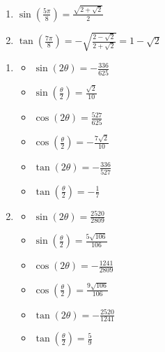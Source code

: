 \begin{multicols}{2}

\begin{enumerate}

\setcounter{enumi}{\value{HW}}

\item $\sin \left( \frac{5\pi}{8} \right) = \frac{\sqrt{2 + \sqrt{2}}}{2}$
\item $\tan \left( \frac{7\pi}{8} \right) = -\sqrt{ \frac{2 - \sqrt{2}}{2 + \sqrt{2}} } =1-\sqrt{2}$

\setcounter{HW}{\value{enumi}}

\end{enumerate}

\end{multicols}

\begin{enumerate}

\setcounter{enumi}{\value{HW}}

\item \begin{multicols}{3}

\begin{itemize}

\item $\sin(2\theta) = -\frac{336}{625}$
\item $\sin\left(\frac{\theta}{2}\right) = \frac{\sqrt{2}}{10}$
\item $\cos(2\theta) = \frac{527}{625}$
\item $\cos\left(\frac{\theta}{2}\right) = -\frac{7\sqrt{2}}{10}$
\item $\tan(2\theta) = -\frac{336}{527}$
\item $\tan\left(\frac{\theta}{2}\right) = -\frac{1}{7}$

\end{itemize}

\end{multicols}

\item \begin{multicols}{3}

\begin{itemize}

\item $\sin(2\theta) = \frac{2520}{2809}$
\item $\sin\left(\frac{\theta}{2}\right) = \frac{5\sqrt{106}}{106}$
\item $\cos(2\theta) = -\frac{1241}{2809}$
\item $\cos\left(\frac{\theta}{2}\right) = \frac{9\sqrt{106}}{106}$
\item $\tan(2\theta) = -\frac{2520}{1241}$
\item $\tan\left(\frac{\theta}{2}\right) = \frac{5}{9}$


\end{itemize}
\end{multicols}
\end{enumerate}
